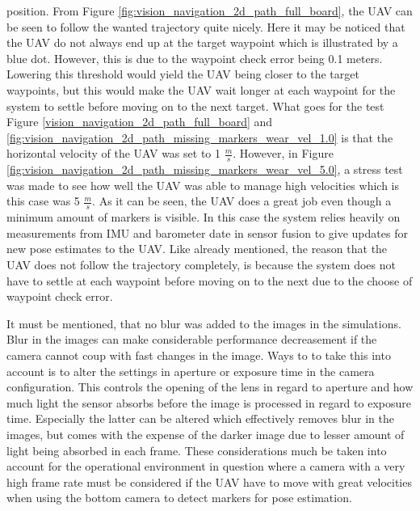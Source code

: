 \documentclass[../Head/report.tex]{subfiles}
\begin{document}
position. From Figure \ref{fig:vision_navigation_2d_path_full_board}, the UAV can be seen to follow the wanted trajectory quite nicely. Here it may be noticed that the UAV do not always end up at the target waypoint which is illustrated by a blue dot. However, this is due to the waypoint check error being 0.1 meters. Lowering this threshold would yield the UAV being closer to the target waypoints, but this would make the UAV wait longer at each waypoint for the system to settle before moving on to the next target. What goes for the test Figure \ref{vision_navigation_2d_path_full_board} and \ref{fig:vision_navigation_2d_path_missing_markers_wear_vel_1.0} is that the horizontal velocity of the UAV was set to 1 $\frac{m}{s}$. However, in Figure \ref{fig:vision_navigation_2d_path_missing_markers_wear_vel_5.0}, a stress test was made to see how well the UAV was able to manage high velocities which is this case was 5 $\frac{m}{s}$. As it can be seen, the UAV does a great job even though a minimum amount of markers is visible. In this case the system relies heavily on measurements from IMU and barometer date in sensor fusion to give updates for new pose estimates to the UAV. Like already mentioned, the reason that the UAV does not follow the trajectory completely, is because the system does not have to settle at each waypoint before moving on to the next due to the choose of waypoint check error. 

It must be mentioned, that no blur was added to the images in the simulations. Blur in the images can make considerable performance decreasement if the camera cannot coup with fast changes in the image. Ways to to take this into account is to alter the settings in aperture or exposure time in the camera configuration. This controls the opening of the lens in regard to aperture and how much light the sensor absorbs before the image is processed in regard to exposure time. Especially the latter can be altered which effectively removes blur in the images, but comes with the expense of the darker image due to lesser amount of light being absorbed in each frame. These considerations much be taken into account for the operational environment in question where a camera with a very high frame rate must be considered if the UAV have to move with great velocities when using the bottom camera to detect markers for pose estimation. 
\end{document}
